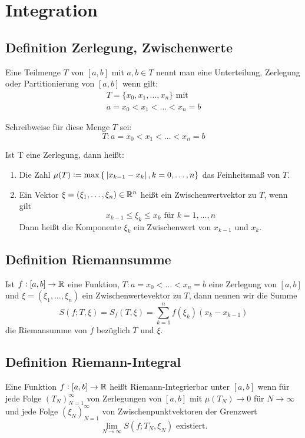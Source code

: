 \section{Integration}

\subsection{Definition Zerlegung, Zwischenwerte}
Eine Teilmenge $T$ von $[a,b]$ mit $a, b \in T$ nennt man eine
Unterteilung, Zerlegung oder Partitionierung von $[a, b]$ wenn
gilt:
\begin{eqnarray*}
    T = \{ x_0, x_1, \ldots , x_n\} \text{ mit}\\
    a = x_0 < x_1 < \ldots < x_n = b
\end{eqnarray*}

Schreibweise für diese Menge $T$ sei:
\begin{equation*}
    T: a = x_0 < x_1 < \ldots < x_n = b
\end{equation*}

Ist T eine Zerlegung, dann heißt:
\begin{enumerate}[label= (\alph*)]
    \item Die Zahl $\mu(T) :=
        \max{ \{\ \abs{x_{k-1} - x_k}, k = 0, \ldots, n \} }$
        das Feinheitsmaß von $T$.
    \item Ein Vektor $\xi = (\xi_1, \ldots, \xi_n) \in \mathbb{R}^n$ heißt
        ein Zwischenwertvektor zu $T$, wenn gilt
        \begin{equation*}
            x_{k-1} \leq \xi_k \leq x_k \text{ für } k = 1, \ldots, n
        \end{equation*}
        Dann heißt die Komponente $\xi_k$ ein Zwischenwert von
        $x_{k-1}$ und $x_k$.
\end{enumerate}

\subsection{Definition Riemannsumme}
Ist $f: [a,b] \rightarrow \mathbb{R}$ eine Funktion, $T: a=x_0<\ldots<x_n=b$
eine Zerlegung von $[a, b]$ und $\xi = (\xi_1, \ldots, \xi_n)$ ein
Zwischenwertevektor zu $T$, dann nennen wir die Summe
\begin{equation*}
    S(f; T, \xi) = S_f(T, \xi) = \sum_{k=1}^n f(\xi_k)(x_k - x_{k-1})
\end{equation*}
die Riemansumme von $f$ bezüglich $T$ und $\xi$.

\subsection{Definition Riemann-Integral}
Eine Funktion $f: [a, b] \rightarrow \mathbb{R}$ heißt Riemann-Integrierbar
unter $[a, b]$ wenn für jede Folge ${(T_N)}_{N=1}^\infty$ von Zerlegungen
von $[a,b]$ mit $\mu(T_N) \rightarrow 0$ für $N \rightarrow \infty$
und jede Folge ${(\xi_N)}_{N=1}^\infty$ von Zwischenpunktvektoren
der Grenzwert
\begin{equation*}
    \lim_{N \rightarrow \infty} S(f; T_N, \xi_N) \text{ existiert.}
\end{equation*}

